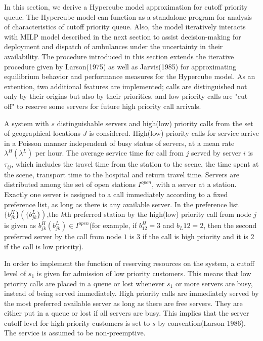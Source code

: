 \documentclass{article}
\begin{document}
In this section, we derive a Hypercube model approximation for cutoff priority queue. The Hypercube model can function as a standalone program for analysis of characteristics of cutoff priority queue. Also, the model iteratively interacts with MILP model described in the next section to assist decision-making for deployment and dispatch of ambulances under the uncertainty in their availability. The procedure introduced in this section extends the iterative procedure given by Larson(1975) as well as Jarvis(1985) for approximating equilibrium behavior and performance measures for the Hypercube model. As an extention, two additional features are implemented; calls are distinguished not only by their origins but also by their priorities, and low priority calls are "cut off" to reserve some servers for future high priority call arrivals.  

A system with $s$ distinguishable servers and high(low) priority calls from the set of  geographical locations $J$ is considered. High(low) priority calls for service arrive in a Poisson manner independent of busy status of servers, at a mean rate $\lambda^H(\lambda^L)$ per hour. The average service time for call from $j$ served by server $i$ is $\tau_{ij}$, which includes the travel time from the station to the scene, the time spent at the scene, transport time to the hospital and return travel time. Servers are distributed among the set of open stations $I^{open}$, with a server at a station. Exactly one server is assigned to a call immediately according to a fixed preference list, as long as there is any available server. In the preference list $\{b^H_{jk}\}(\{b^L_{jk}\})$,the $k$th preferred station by the high(low) priority call from node $j$ is given as $b^H_{jk}(b^L_{jk}) \in I^{open}$(for example, if $b^H_{12}=3$ and $b_L{12}=2$, then the second preferred server by the call from node $1$ is $3$ if the call is high priority and it is $2$ if the call is low priority). 

In order to implement the function of reserving resources on the system, a cutoff level of $s_1$ is given for admission of low priority customers. This means that low priority calls are placed in a queue or lost whenever $s_1$ or more servers are busy, instead of being served immediately. High priority calls are immediately served by the most preferred available server as long as there are free servers. They are either put in a queue or lost if all servers are busy. This implies that the server cutoff level for high priority customers is set to $s$ by convention(Larson 1986). The service is assumed to be non-preemptive.
\end{document}
